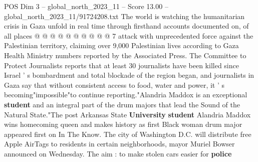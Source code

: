 \begin{textsample}{POS Dim 3 – global\_north\_2023\_11 – Score 13.00 – global\_north\_2023\_11/91724208.txt}
The world is watching the humanitarian crisis in Gaza unfold in real time through firsthand accounts documented on, of all places @ @ @ @ @ @ @ @ @ @ 7 attack with unprecedented force against the Palestinian territory, claiming over 9,000 Palestinian lives according to Gaza Health Ministry numbers reported by the Associated Press.
The Committee to Protect Journalists reports that at least 30 journalists have been killed since Israel ' s bombardment and total blockade of the region began, and journalists in Gaza say that without consistent access to food, water and power, it ' s becoming"impossible"to continue reporting."Alandria Maddox is an exceptional \textbf{student} and an integral part of the drum majors that lead the Sound of the Natural State."The post Arkansas State \textbf{University} \textbf{student} Alandria Maddox wins homecoming queen and makes history as first Black woman drum major appeared first on In The Know.
The city of Washington D.C. will distribute free Apple AirTags to residents in certain neighborhoods, mayor Muriel Bowser announced on Wednesday.
The aim : to make stolen cars easier for \textbf{police}

\end{textsample}
